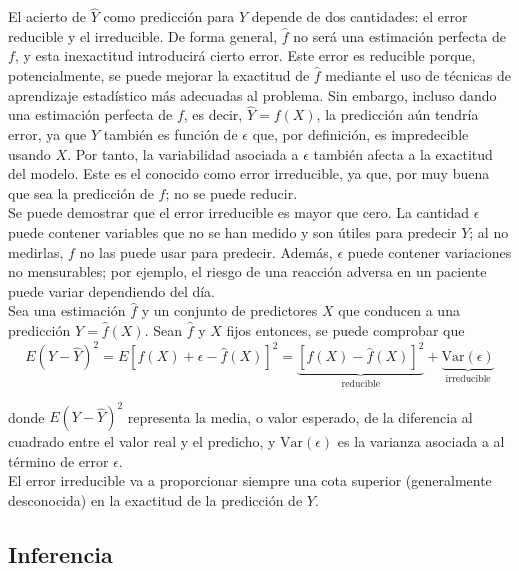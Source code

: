El acierto de $\hat{Y}$ como predicción para $Y$ depende de dos cantidades: el error reducible y el irreducible. De forma general, $\hat{f}$ no será una estimación perfecta de $f$, y esta inexactitud introducirá cierto error. Este error es reducible porque, potencialmente, se puede mejorar la exactitud de $\hat{f}$ mediante el uso de técnicas de aprendizaje estadístico más adecuadas al problema. Sin embargo, incluso dando una estimación perfecta de $f$, es decir, $\hat{Y} = f(X)$, la predicción aún tendría error, ya que $Y$ también es función de $\epsilon$ que, por definición, es impredecible usando $X$. Por tanto, la variabilidad asociada a $\epsilon$ también afecta a la exactitud del modelo. Este es el conocido como error irreducible, ya que, por muy buena que sea la predicción de $f$; no se puede reducir. \\

Se puede demostrar que el error irreducible es mayor que cero. La cantidad $\epsilon$ puede contener variables que no se han medido y son útiles para predecir $Y$; al no medirlas, $f$ no las puede usar para predecir. Además, $\epsilon$ puede contener variaciones no mensurables; por ejemplo, el riesgo de una reacción adversa en un paciente puede variar dependiendo del día. \\

Sea una estimación $\hat{f}$ y un conjunto de predictores $X$ que conducen a una predicción $\hat{Y} = \hat{f}(X)$. Sean $\hat{f}$ y $X$ fijos entonces, se puede comprobar que 
\begin{equation}
E(Y - \hat{Y})^2 = E[ f(X) + \epsilon - \hat{f}(X)]^2 = \underbrace{[f(X) - \hat{f}(X)]^2}_{\text{reducible}} + \underbrace{\text{Var}(\epsilon)}_{\text{irreducible}}
\end{equation}

\noindent donde $E(Y - \hat{Y})^2$ representa la media, o valor esperado, de la diferencia al cuadrado entre el valor real y el predicho, y $\text{Var}(\epsilon)$ es la varianza asociada a al término de error $\epsilon$. \\

El error irreducible va a proporcionar siempre una cota superior (generalmente desconocida) en la exactitud de la predicción de $Y$.

\subsection{Inferencia}


